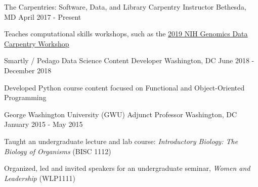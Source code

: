 \begin{cventries}
  \cventry
    {The Carpentries: Software, Data, and Library Carpentry} %
    {Instructor} %
    {Bethesda, MD} %
    {April 2017 - Present} %
    {
      \begin{cvitems} %
        \item {Teaches computational skills workshops, such as the \href{https://davemcg.github.io/2019-05-01-NIH-Library-Data-Carpentry-Genomics/}{\textcolor{awesome-skyblue}{2019 NIH Genomics Data Carpentry Workshop}}}
      \end{cvitems}
    }
    
  \cventry
    {Smartly / Pedago} %
    {Data Science Content Developer} %
    {Washington, DC} %
    {June 2018 - December 2018} %
    {
      \begin{cvitems} %
        \item Developed Python course content focused on Functional and Object-Oriented Programming
      \end{cvitems}
    }

  \cventry
    {George Washington University (GWU)} %
    {Adjunct Professor} %
    {Washington, DC} %
    {January 2015 - May 2015} %
    {
      \begin{cvitems} %
        \item {Taught an undergraduate lecture and lab course: \textit{Introductory Biology: The Biology of Organisms} (BISC 1112)}
        \item {Organized, led and invited speakers for an undergraduate seminar, \textit{Women and Leadership} (WLP1111)}
      \end{cvitems}
    }

\end{cventries}
